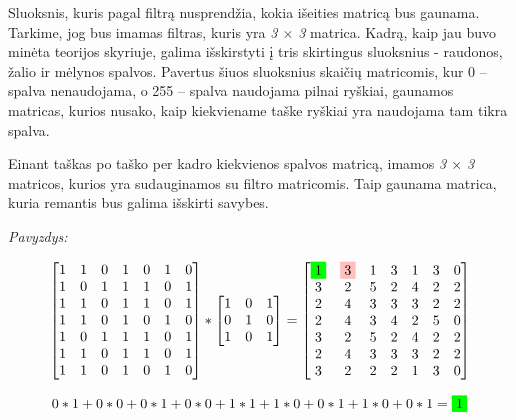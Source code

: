 \documentclass{VUMIFInfKursinis}
\begin{document}
Sluoksnis, kuris pagal filtrą nusprendžia, kokia išeities matricą bus gaunama. Tarkime, jog bus imamas filtras, kuris yra \textit{3 $\times$ 3} matrica. Kadrą, kaip jau buvo minėta teorijos skyriuje, galima išskirstyti į tris skirtingus sluoksnius - raudonos, žalio ir mėlynos spalvos. Pavertus šiuos sluoksnius skaičių matricomis, kur 0 – spalva nenaudojama, o 255 – spalva naudojama pilnai ryškiai, gaunamos matricas, kurios nusako, kaip kiekviename taške ryškiai yra naudojama tam tikra spalva.

Einant taškas po taško per kadro kiekvienos spalvos matricą, imamos \textit{3 $\times$ 3} matricos, kurios yra sudauginamos su filtro matricomis. Taip gaunama matrica, kuria remantis bus galima išskirti savybes.

\textit{Pavyzdys:}

\begin{equation}\label{eq:convl}
	\begin{bmatrix}
	1 & 1 & 0 & 1 & 0 & 1 & 0 \\
	1 & 0 & 1 & 1 & 1 & 0 & 1 \\
	1 & 1 & 0 & 1 & 1 & 0 & 1 \\
	1 & 1 & 0 & 1 & 0 & 1 & 0 \\
	1 & 0 & 1 & 1 & 1 & 0 & 1 \\
	1 & 1 & 0 & 1 & 1 & 0 & 1 \\
	1 & 1 & 0 & 1 & 0 & 1 & 0
	\end{bmatrix}
	*
	\begin{bmatrix}
	1 & 0 & 1 \\
	0 & 1 & 0 \\
	1 & 0 & 1
	\end{bmatrix}
	=
	\begin{bmatrix}
	\colorbox{green}{1} & \colorbox{pink}{3} & 1 & 3 & 1 & 3 & 0 \\
	3 & 2 & 5 & 2 & 4 & 2 & 2 \\
	2 & 4 & 3 & 3 & 3 & 2 & 2 \\
	2 & 4 & 3 & 4 & 2 & 5 & 0 \\
	3 & 2 & 5 & 2 & 4 & 2 & 2 \\
	2 & 4 & 3 & 3 & 3 & 2 & 2 \\
	3 & 2 & 2 & 2 & 1 & 3 & 0
	\end{bmatrix}
\end{equation}

\begin{equation}\label{eq:convl1}
	0*1+0*0+0*1+0*0+1*1+1*0+0*1+1*0+0*1=\colorbox{green}{1}
\end{equation}
\end{document}
